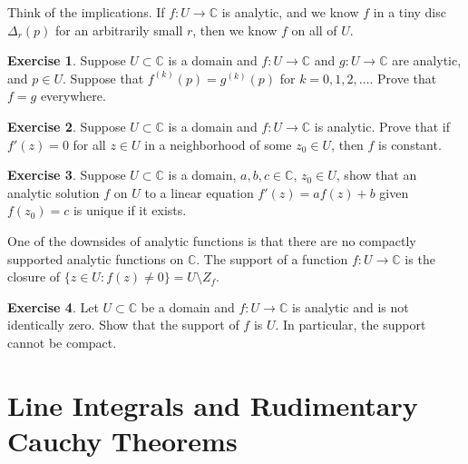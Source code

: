 \documentclass[12pt,openany]{book}
\newcommand{\C}{{\mathbb{C}}}
\theoremstyle{plain}
\theoremstyle{remark}
\theoremstyle{definition}
\newenvironment{exbox}{%
    \def\FrameCommand{\vrule width 1pt \relax\hspace {10pt}}%
    \MakeFramed {\advance \hsize -\width \FrameRestore }%
}{%
    \endMakeFramed
}
\theoremstyle{exercise}
\newtheorem{exercise}{Exercise}[section]
\theoremstyle{example}
\begin{document}
Think of the implications.  If $f \colon U \to \C$ is analytic, and we know
$f$ in a tiny disc $\Delta_r(p)$ for an arbitrarily small $r$, then
we know $f$ on all of $U$.

\begin{exbox}
\begin{exercise}
Suppose $U \subset \C$ is a domain and $f \colon U \to \C$ and $g \colon U \to
\C$ are analytic, and $p \in U$.  Suppose that $f^{(k)}(p) = g^{(k)}(p)$
for $k=0,1,2,\ldots$.  Prove that $f = g$ everywhere.
\end{exercise}

\begin{exercise}
Suppose $U \subset \C$ is a domain and $f \colon U \to \C$ is analytic.
Prove that if $f'(z) = 0$ for
all $z \in U$ in a neighborhood of some $z_0 \in U$, then $f$ is constant.
\end{exercise}

\begin{exercise}
Suppose $U \subset \C$ is a domain, $a, b, c \in \C$, $z_0 \in U$, show that
an analytic solution $f$ on $U$ to a linear equation $f'(z) = a f(z) + b$
given $f(z_0) = c$ is unique if it exists.
\end{exercise}
\end{exbox}

One of the downsides of analytic functions is that there are no compactly
supported analytic functions on $\C$.  The support of a function $f \colon U
\to \C$ is the closure of $\{ z \in U : f(z) \not= 0 \} = U \setminus Z_f$.

\begin{exbox}
\begin{exercise}
Let $U \subset \C$ be a domain and $f \colon U \to \C$ is analytic and
is not identically zero.
Show that the support of $f$ is $U$.
In particular, the support cannot be compact.
\end{exercise}
\end{exbox}


\chapter{Line Integrals and Rudimentary Cauchy Theorems} \label{ch:cauchysimple}
\end{document}
